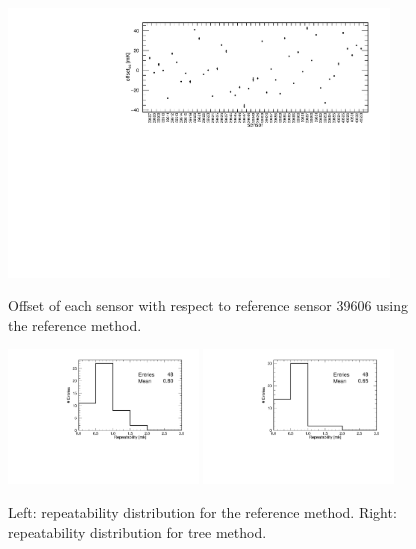 \begin{figure}[htbp]
\centering
{\includegraphics[width=0.9\textwidth]{./figure_13.pdf}}
\caption{Offset of each sensor with respect to reference sensor 39606 using the reference method.}
\label{fig:offsets_tree_1}
\end{figure}

\begin{figure}[htbp]
\centering
{\includegraphics[width=0.45\textwidth]{./figure_14_a.pdf}}
{\includegraphics[width=0.45\textwidth]{./figure_14_b.pdf}}
\caption{Left: repeatability distribution for the reference method. Right: repeatability distribution for tree method.}
\label{fig:offsets_tree_2}
\end{figure}

